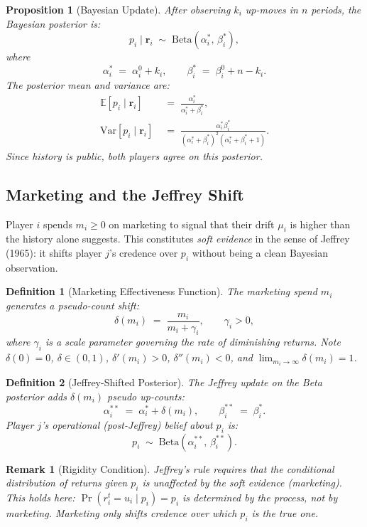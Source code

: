 \documentclass[12pt,a4paper]{article}
\newtheorem{definition}{Definition}[section]
\newtheorem{proposition}{Proposition}[section]
\newtheorem{remark}{Remark}[section]
\newcommand{\E}{\mathbb{E}}
\newcommand{\Var}{\mathrm{Var}}
\newcommand{\1}{\mathbf{1}}
\begin{document}
\begin{proposition}[Bayesian Update]
After observing $k_i$ up-moves in $n$ periods, the Bayesian posterior is:
\[
  p_i \mid \mathbf{r}_i \;\sim\; \mathrm{Beta}(\alpha_i^*,\, \beta_i^*),
\]
where
\[
  \alpha_i^* \;=\; \alpha_i^0 + k_i, \qquad \beta_i^* \;=\; \beta_i^0 + n - k_i.
\]
The posterior mean and variance are:
\begin{align}
  \E[p_i \mid \mathbf{r}_i] &\;=\; \frac{\alpha_i^*}{\alpha_i^* + \beta_i^*}, \label{eq:post_mean}\\
  \Var[p_i \mid \mathbf{r}_i] &\;=\; \frac{\alpha_i^* \beta_i^*}{(\alpha_i^* + \beta_i^*)^2 (\alpha_i^* + \beta_i^* + 1)}. \label{eq:post_var}
\end{align}
Since history is public, both players agree on this posterior.
\end{proposition}

\subsection{Marketing and the Jeffrey Shift}

Player $i$ spends $m_i \geq 0$ on marketing to signal that their drift $\mu_i$ is higher than the history alone suggests. This constitutes \emph{soft evidence} in the sense of Jeffrey (1965): it shifts player $j$'s credence over $p_i$ without being a clean Bayesian observation.

\begin{definition}[Marketing Effectiveness Function]
The marketing spend $m_i$ generates a pseudo-count shift:
\[
  \delta(m_i) \;=\; \frac{m_i}{m_i + \gamma_i}, \qquad \gamma_i > 0,
\]
where $\gamma_i$ is a scale parameter governing the rate of diminishing returns. Note $\delta(0) = 0$, $\delta \in (0,1)$, $\delta'(m_i) > 0$, $\delta''(m_i) < 0$, and $\lim_{m_i \to \infty} \delta(m_i) = 1$.
\end{definition}

\begin{definition}[Jeffrey-Shifted Posterior]
The Jeffrey update on the Beta posterior adds $\delta(m_i)$ pseudo up-counts:
\[
  \alpha_i^{**} \;=\; \alpha_i^* + \delta(m_i), \qquad \beta_i^{**} \;=\; \beta_i^*.
\]
Player $j$'s operational (post-Jeffrey) belief about $p_i$ is:
\[
  p_i \;\sim\; \mathrm{Beta}(\alpha_i^{**},\, \beta_i^{**}).
\]
\end{definition}

\begin{remark}[Rigidity Condition]
Jeffrey's rule requires that the conditional distribution of returns given $p_i$ is unaffected by the soft evidence (marketing). This holds here: $\Pr(r_i^t = u_i \mid p_i)= p_i$ is determined by the process, not by marketing. Marketing only shifts credence over \emph{which} $p_i$ is the true one.
\end{remark}
\end{document}
